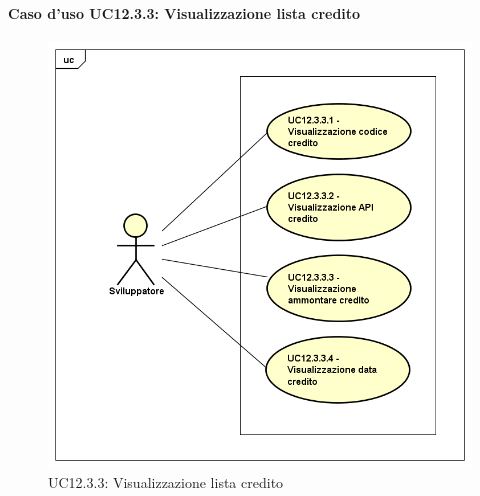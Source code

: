 \newpage
\paragraph{Caso d'uso UC12.3.3: Visualizzazione lista credito}
\label{UC12_3_3}
\begin{figure}[ht]
	\centering
	\includegraphics[scale=0.45]{UML/UC12_3_3.png}
	\caption{UC12.3.3: Visualizzazione lista credito}
\end{figure}

